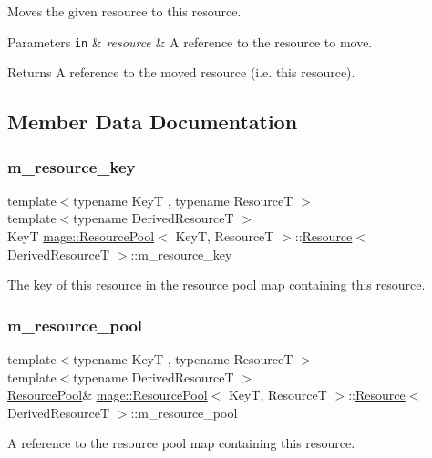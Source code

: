 Moves the given resource to this resource.


\begin{DoxyParams}[1]{Parameters}
\mbox{\tt in}  & {\em resource} & A reference to the resource to move. \\
\hline
\end{DoxyParams}
\begin{DoxyReturn}{Returns}
A reference to the moved resource (i.\+e. this resource). 
\end{DoxyReturn}


\subsection{Member Data Documentation}
\mbox{\label{classmage_1_1_resource_pool_1_1_resource_a7200f97a65becde72367c9d0e3641621}} 
\subsubsection{\texorpdfstring{m\+\_\+resource\+\_\+key}{m\_resource\_key}}
{\footnotesize\ttfamily template$<$typename KeyT , typename ResourceT $>$ \\
template$<$typename Derived\+ResourceT $>$ \\
KeyT \mbox{\hyperlink{classmage_1_1_resource_pool}{mage\+::\+Resource\+Pool}}$<$ KeyT, ResourceT $>$\+::\mbox{\hyperlink{classmage_1_1_resource_pool_1_1_resource}{Resource}}$<$ Derived\+ResourceT $>$\+::m\+\_\+resource\+\_\+key\hspace{0.3cm}{\ttfamily [private]}}

The key of this resource in the resource pool map containing this resource. \mbox{\label{classmage_1_1_resource_pool_1_1_resource_a9e5b68fd638ed6bd3b271afff834aced}} 
\subsubsection{\texorpdfstring{m\+\_\+resource\+\_\+pool}{m\_resource\_pool}}
{\footnotesize\ttfamily template$<$typename KeyT , typename ResourceT $>$ \\
template$<$typename Derived\+ResourceT $>$ \\
\mbox{\hyperlink{classmage_1_1_resource_pool}{Resource\+Pool}}\& \mbox{\hyperlink{classmage_1_1_resource_pool}{mage\+::\+Resource\+Pool}}$<$ KeyT, ResourceT $>$\+::\mbox{\hyperlink{classmage_1_1_resource_pool_1_1_resource}{Resource}}$<$ Derived\+ResourceT $>$\+::m\+\_\+resource\+\_\+pool\hspace{0.3cm}{\ttfamily [private]}}

A reference to the resource pool map containing this resource. 